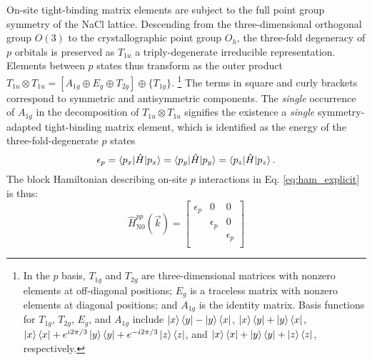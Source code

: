 \documentclass[twocolumn,showpacs,preprintnumbers,superscriptaddress,prb,floatfix,aps,10pt]{revtex4-1}
\newcommand*{\ham}{\hat{H}}
\begin{document}
On-site tight-binding matrix elements are subject to the full point group symmetry of the NaCl lattice. Descending from the three-dimensional orthogonal group $O(3)$ to the crystallographic point group $O_h$, the three-fold degeneracy of $p$ orbitals is preserved as $T_{1u}$ a triply-degenerate irreducible representation. Elements between $p$ states thus transform as the outer product $T_{1u} \otimes T_{1u} = [A_{1g} \oplus E_g \oplus T_{2g}] \oplus \{T_{1g}\}$. \footnote{ In the $p$ basis, $T_{1g}$ and $T_{2g}$ are three-dimensional matrices with nonzero elements at off-diagonal positions; $E_g$ is a traceless matrix with nonzero elements at diagonal positions; and $A_{1g}$ is the identity matrix. Basis functions for $T_{1g}$, $T_{2g}$, $E_g$, and $A_{1g}$ include $\ket{x}\bra{y} - \ket{y}\bra{x}$, $\ket{x}\bra{y} + \ket{y}\bra{x}$, $\ket{x}\bra{x} + e^{i2\pi/3}\ket{y}\bra{y} + e^{-i2\pi/3}\ket{z}\bra{z}$, and $\ket{x}\bra{x} + \ket{y}\bra{y} + \ket{z}\bra{z}$, respectively.} The terms in square and curly brackets correspond to symmetric and antisymmetric components. The \emph{single} occurrence of $A_{1g}$ in the decomposition of $T_{1u} \otimes T_{1u}$ signifies the existence a \emph{single} symmetry-adapted tight-binding matrix element, which is identified as the energy of the three-fold-degenerate $p$ states
%
\begin{equation}
\epsilon_{p}
= \braket{p_x | \ham | p_x} 
= \braket{p_y | \ham | p_y} 
= \braket{p_z | \ham | p_z} .
\end{equation}
%
The block Hamiltonian describing on-site $p$ interactions in Eq. \ref{eq:ham_explicit} is thus:
%
\begin{equation}
\label{eq:0pp}
\ham_{\textrm{N0}}^{pp}(\vec{k}) =
\begin{bmatrix}
\epsilon_{p} & 0 & 0 \\
  & \epsilon_{p} & 0 \\
  &   & \epsilon_{p} \\
\end{bmatrix}
\end{equation}
\end{document}
